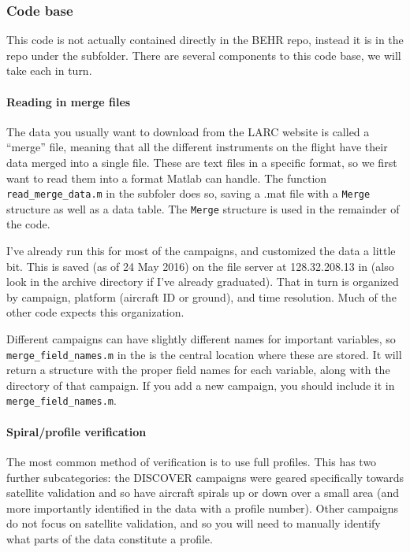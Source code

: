 \documentclass[12pt]{article}
\begin{document}
		\subsubsection{Code base}
		This code is not actually contained directly in the BEHR repo, instead it is in the  repo under the  subfolder. There are several components to this code base, we will take each in turn.

		\paragraph{Reading in merge files}
		
		The data you usually want to download from the LARC website is called a ``merge'' file, meaning that all the different instruments on the flight have their data merged into a single file. These are text files in a specific format, so we first want to read them into a format Matlab can handle.  The function \lstinline$read_merge_data.m$ in the  subfoler does so, saving a .mat file with a \lstinline$Merge$ structure as well as a data table. The \lstinline$Merge$ structure is used in the remainder of the code.
		
		I've already run this for most of the campaigns, and customized the data a little bit. This is saved (as of 24 May 2016) on the file server at 128.32.208.13 in  (also look in the archive directory if I've already graduated). That in turn is organized by campaign, platform (aircraft ID or ground), and time resolution. Much of the other code expects this organization. 
		
		Different campaigns can have slightly different names for important variables, so \lstinline$merge_field_names.m$ in the  is the central location where these are stored. It will return a structure with the proper field names for each variable, along with the directory of that campaign. If you add a new campaign, you should include it in \lstinline$merge_field_names.m$.
		
		\paragraph{Spiral/profile verification}
		
		The most common method of verification is to use full profiles. This has two further subcategories: the DISCOVER campaigns were geared specifically towards satellite validation and so have aircraft spirals up or down over a small area (and more importantly identified in the data with a profile number).  Other campaigns do not focus on satellite validation, and so you will need to manually identify what parts of the data constitute a profile.
		
\end{document}
